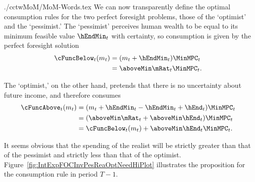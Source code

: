 \documentclass[titlepage]{\econtex}
\begin{document}
\begin{verbatimwrite}{./cctwMoM/MoM-Words.tex}
  We can now transparently define the optimal
  consumption rules for the two perfect foresight problems, those of the
  `optimist' and the `pessimist.'  The `pessimist' perceives human
  wealth to be equal to its minimum feasible value $\hEndMin_{t}$ with certainty, so 
  consumption is given by the perfect foresight solution
  \begin{equation*}\begin{gathered}\begin{aligned}
    \cFuncBelow_{t}(m_{t})  & = ({m}_{t}+\hEndMin_{t})\MinMPC_{t}
    \\  & = \aboveMin \mRat_{t}\MinMPC_{t}
             .
  \end{aligned}\end{gathered}\end{equation*}

  The `optimist,' on the other hand, pretends that there is no uncertainty
  about future income, and therefore consumes
  \begin{equation*}\begin{gathered}\begin{aligned}
    \cFuncAbove_{t}(m_{t})  & = ({m}_{t} +\hEndMin_{t} - \hEndMin_{t} + \hEnd_{t} )\MinMPC_{t}
    \\    & = (\aboveMin \mRat_{t} + \aboveMin \hEnd_{t})\MinMPC_{t}
    \\      & = \cFuncBelow_{t}(m_{t})+\aboveMin \hEnd_{t} \MinMPC_{t}
                 .
  \end{aligned}\end{gathered}\end{equation*}

  It seems obvious that the spending of the realist will be strictly greater
  than that of the pessimist and strictly less than that of the
  optimist.  Figure~\ref{fig:IntExpFOCInvPesReaOptNeedHiPlot} illustrates the proposition for the consumption rule in period $T-1$.  
\end{verbatimwrite}

\end{document}
